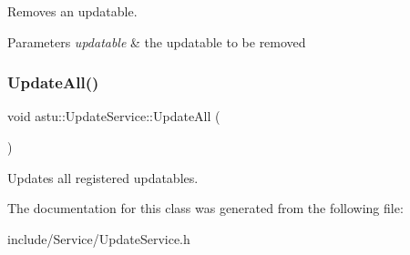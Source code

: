 Removes an updatable.


\begin{DoxyParams}{Parameters}
{\em updatable} & the updatable to be removed \\
\hline
\end{DoxyParams}
\mbox{\label{classastu_1_1UpdateService_a9ee615ce365e1910446a2646b0a2ad9a}} 
\subsubsection{\texorpdfstring{Update\+All()}{UpdateAll()}}
{\footnotesize\ttfamily void astu\+::\+Update\+Service\+::\+Update\+All (\begin{DoxyParamCaption}{ }\end{DoxyParamCaption})}

Updates all registered updatables. 

The documentation for this class was generated from the following file\+:\begin{DoxyCompactItemize}
\item 
include/\+Service/Update\+Service.\+h\end{DoxyCompactItemize}
